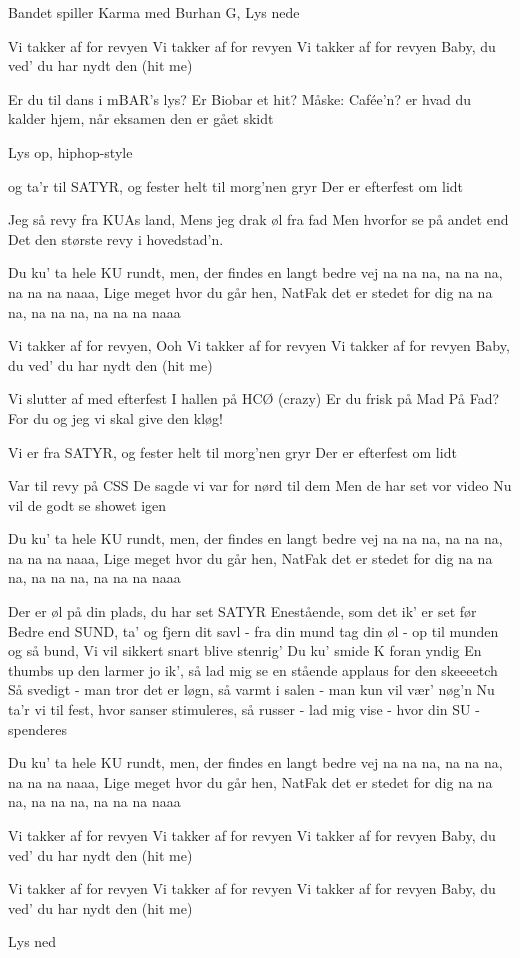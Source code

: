 \documentclass[a4paper,11pt]{article}
\begin{document}
\begin{song}
\scene Bandet spiller Karma med Burhan G, Lys nede

 Vi takker af for revyen
Vi takker af for revyen
Vi takker af for revyen
Baby, du ved' du har nydt den (hit me)

 Er du til dans i mBAR’s lys? %
Er Biobar et hit? %
Måske: Cafée'n? er hvad du kalder hjem, når eksamen den er gået skidt %

\scene Lys op, hiphop-style

 og ta'r til SATYR, og fester helt til morg'nen gryr
Der er efterfest om lidt

 Jeg så revy fra KUAs land,
Mens jeg drak øl fra fad
Men hvorfor se på andet end
Det den største revy i hovedstad'n. %

 Du ku’ ta hele KU rundt, men, der findes en langt bedre vej
na na na, na na na, na na na naaa,
Lige meget hvor du går hen, NatFak det er stedet for dig
na na na, na na na, na na na naaa

 Vi takker af for revyen, Ooh
Vi takker af for revyen
Vi takker af for revyen
Baby, du ved' du har nydt den (hit me)

 Vi slutter af med efterfest
I hallen på HCØ (crazy)
Er du frisk på Mad På Fad? For du og jeg vi skal give den kløg!

 Vi er fra SATYR, og fester helt til morg'nen gryr
Der er efterfest om lidt

 Var til revy på CSS
De sagde vi var for nørd til dem
Men de har set vor video
Nu vil de godt se showet igen

 Du ku’ ta hele KU rundt, men, der findes en langt bedre vej
na na na, na na na, na na na naaa,
Lige meget hvor du går hen, NatFak det er stedet for dig
na na na, na na na, na na na naaa

 Der er øl på din plads, du har set SATYR
Enestående, som det ik' er set før
Bedre end SUND, ta' og fjern dit savl - fra din mund
tag din øl - op til munden og så bund,
Vi vil sikkert snart blive stenrig'
Du ku’ smide K foran yndig
En thumbs up den larmer jo ik’, så lad mig se en stående applaus for den skeeeetch
Så svedigt - man tror det er løgn, så varmt i salen - man kun vil vær' nøg'n
Nu ta'r vi til fest, hvor sanser stimuleres,
så russer - lad mig vise - hvor din SU - spenderes

 Du ku’ ta hele KU rundt, men, der findes en langt bedre vej
na na na, na na na, na na na naaa,
Lige meget hvor du går hen, NatFak det er stedet for dig
na na na, na na na, na na na naaa

 Vi takker af for revyen
Vi takker af for revyen
Vi takker af for revyen
Baby, du ved' du har nydt den (hit me)

 Vi takker af for revyen
Vi takker af for revyen
Vi takker af for revyen
Baby, du ved' du har nydt den (hit me)

\scene Lys ned
\end{song}
\end{document}

